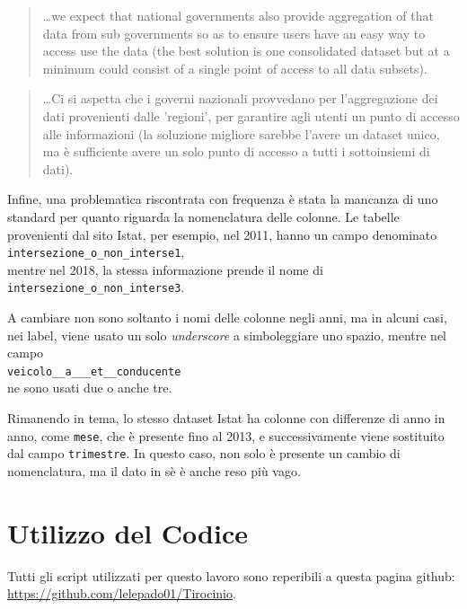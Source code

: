 \documentclass[a4paper,12pt]{report}
\newcommand{\columnstyle}[1]{\texttt{#1}}
\newcommand{\quotestyle}[1]{\textit{#1}}
\newcommand{\skipline}{\vspace{0.2in}}
\begin{document}
\begin{quotation}
    \dots we expect that national governments also provide aggregation 
    of that data from 
    sub governments so as to ensure users have an easy way to access use the data 
    (the best solution is one consolidated dataset but at a minimum could consist of a 
    single point of access to all data subsets).\cite{OPENDATAINDEX:1}
\end{quotation}

\begin{quotation}
    \dots Ci si aspetta che i governi nazionali provvedano per 
    l'aggregazione dei dati provenienti dalle 'regioni', per garantire agli utenti 
    un punto di accesso 
    alle informazioni (la soluzione migliore sarebbe l'avere un dataset unico, ma è sufficiente 
    avere un solo punto di accesso a tutti i sottoinsiemi di dati). 
\end{quotation}

\skipline
Infine, 
una problematica riscontrata con frequenza è stata la mancanza di uno standard per quanto 
riguarda la nomenclatura delle colonne. 
Le tabelle provenienti dal sito Istat, per esempio, nel 2011, hanno un campo denominato\\
\indent\columnstyle{intersezione\_o\_non\_interse1},\\
mentre nel 2018, la stessa informazione prende il nome di\\
\indent \columnstyle{intersezione\_o\_non\_interse3}.

A cambiare non sono soltanto i nomi delle colonne negli anni, 
ma in alcuni casi, nei label, viene usato un solo \quotestyle{underscore} a 
simboleggiare uno spazio, mentre nel campo\\
\indent\columnstyle{veicolo\_\_a\_\_\_et\_\_conducente}\\
ne sono usati due o anche tre. 

Rimanendo in tema, lo stesso dataset Istat ha colonne con differenze di anno in anno, 
come \columnstyle{mese}, che è presente fino al 2013, e successivamente viene 
sostituito dal campo \columnstyle{trimestre}. 
In questo caso, non solo è presente un cambio di nomenclatura, ma il dato in sè è 
anche reso più vago. 

\chapter{Utilizzo del Codice}

Tutti gli script utilizzati per questo lavoro sono reperibili a questa pagina 
github: \url{https://github.com/lelepado01/Tirocinio}. 
\end{document}
